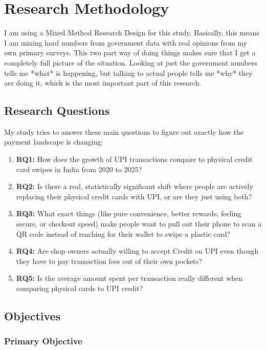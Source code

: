 \chapter{Research Methodology}

I am using a Mixed Method Research Design for this study. Basically, this means I am mixing hard numbers from government data with real opinions from my own primary surveys. This two part way of doing things makes sure that I get a completely full picture of the situation. Looking at just the government numbers tells me *what* is happening, but talking to actual people tells me *why* they are doing it, which is the most important part of this research.

\section{Research Questions}

My study tries to answer these main questions to figure out exactly how the payment landscape is changing:

\begin{enumerate}
    \item \textbf{RQ1:} How does the growth of UPI transactions compare to physical credit card swipes in India from 2020 to 2025?
    \item \textbf{RQ2:} Is there a real, statistically significant shift where people are actively replacing their physical credit cards with UPI, or are they just using both?
    \item \textbf{RQ3:} What exact things (like pure convenience, better rewards, feeling secure, or checkout speed) make people want to pull out their phone to scan a QR code instead of reaching for their wallet to swipe a plastic card?
    \item \textbf{RQ4:} Are shop owners actually willing to accept Credit on UPI even though they have to pay transaction fees out of their own pockets?
    \item \textbf{RQ5:} Is the average amount spent per transaction really different when comparing physical cards to UPI credit?
\end{enumerate}

\section{Objectives}

\subsection{Primary Objective}

